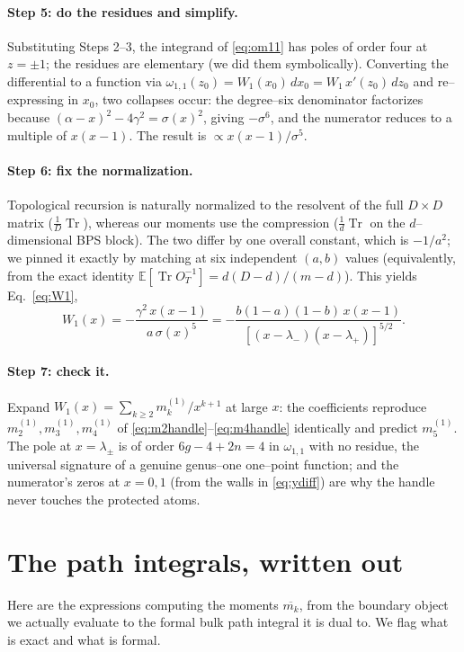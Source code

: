 \documentclass[11pt]{article}
\newcommand{\Tr}{\operatorname{Tr}}
\newcommand{\OT}{O_T}
\begin{document}
\paragraph{Step 5: do the residues and simplify.}
Substituting Steps 2--3, the integrand of \eqref{eq:om11} has poles of order four at $z=\pm1$; the
residues are elementary (we did them symbolically). Converting the differential to a function via
$\omega_{1,1}(z_0)=W_1(x_0)\,dx_0=W_1\,x'(z_0)\,dz_0$ and re--expressing in $x_0$, two collapses occur:
the degree--six denominator factorizes because $(\alpha-x)^2-4\gamma^2=\sigma(x)^2$, giving $-\sigma^6$,
and the numerator reduces to a multiple of $x(x-1)$. The result is $\propto x(x-1)/\sigma^5$.

\paragraph{Step 6: fix the normalization.}
Topological recursion is naturally normalized to the resolvent of the full $D\times D$ matrix
($\tfrac1D\Tr$), whereas our moments use the compression ($\tfrac1d\Tr$ on the $d$--dimensional BPS
block). The two differ by one overall constant, which is $-1/a^2$; we pinned it exactly by matching
at six independent $(a,b)$ values (equivalently, from the exact identity
$\mathbb E[\Tr\OT^{-1}]=d(D-d)/(m-d)$). This yields Eq.~\eqref{eq:W1},
\[
  W_1(x)=-\frac{\gamma^2\,x(x-1)}{a\,\sigma(x)^5}
        =-\frac{b(1-a)(1-b)\,x(x-1)}{[(x-\lambda_-)(x-\lambda_+)]^{5/2}}.
\]

\paragraph{Step 7: check it.}
Expand $W_1(x)=\sum_{k\ge2}m_k^{(1)}/x^{k+1}$ at large $x$: the coefficients reproduce
$m_2^{(1)},m_3^{(1)},m_4^{(1)}$ of \eqref{eq:m2handle}--\eqref{eq:m4handle} identically and predict
$m_5^{(1)}$. The pole at $x=\lambda_\pm$ is of order $6g-4+2n=4$ in $\omega_{1,1}$ with no residue, the
universal signature of a genuine genus--one one--point function; and the numerator's zeros at $x=0,1$
(from the walls in \eqref{eq:ydiff}) are why the handle never touches the protected atoms.

\section{The path integrals, written out}
\label{app:PI}

Here are the expressions computing the moments $\overline{m_k}$, from the boundary object we actually
evaluate to the formal bulk path integral it is dual to. We flag what is exact and what is formal.
\end{document}
